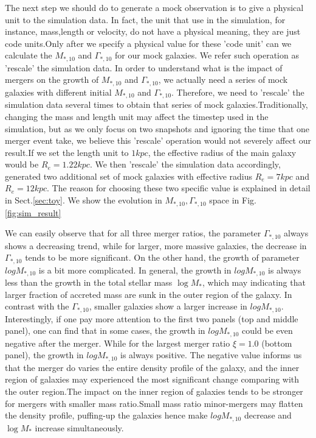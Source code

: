 \documentclass[fleqn,usenatbib]{mnras}
\begin{document}
\par The next step we should do to generate a mock observation is to give a physical unit to the simulation data. In fact, the unit that \cite{nipoti2009} use in the simulation, for instance, mass,length or velocity, do not have a physical meaning, they are just code units.Only after we specify a physical value for these 'code unit' can we calculate the $M_{*,10}$ and $\Gamma_{*,10}$ for our mock galaxies. We refer such operation as 'rescale' the simulation data. In order to understand what is the impact of mergers on the growth of $M_{*,10}$ and $\Gamma_{*,10}$, we actually need a series of mock galaxies with different initial $M_{*,10}$ and $\Gamma_{*,10}$. Therefore, we need to 'rescale' the simulation data several times to obtain that series of mock galaxies.Traditionally, changing the mass and length unit may affect the timestep used in the simulation, but as we only focus on two snapshots and ignoring the time that one merger event take, we believe this 'rescale' operation would not severely affect our result.If we set the length unit to $1 kpc$, the effective radius of the main galaxy would be $R_e = 1.22 kpc$. We then 'rescale' the simulation data accordingly, generated two additional set of mock galaxies with effective radius $R_e = 7kpc$ and $R_e = 12kpc$.  The reason for choosing these two specific value is explained in detail in Sect.\ref{sec:toy}. We show the evolution in $M_{*,10},\Gamma_{*,10}$ space in Fig.\ref{fig:sim_result}
\par We can easily observe that for all three merger ratios, the parameter $\Gamma_{*,10}$ always shows a decreasing trend, while for larger, more massive galaxies, the decrease in $\Gamma_{*,10}$ tends to be more significant. On the other hand, the growth of parameter $log M_{*,10}$ is a bit more complicated. In general, the growth in $log M_{*,10}$ is always less than the growth in the total stellar mass $\log M_*$, which may indicating that larger fraction of accreted mass are sunk in the outer region of the galaxy. In contrast with the $\Gamma_{*,10}$, smaller galaxies show a larger increase in $log M_{*,10}$. Interestingly, if one pay more attention to the first two panels (top and middle panel), one can find that in some cases, the growth in $log M_{*,10}$ could be even negative after the merger. While for the largest merger ratio $\xi = 1.0$ (bottom panel), the growth in $log M_{*,10}$ is always positive. The negative value informs us that the merger do varies the entire density profile of the galaxy, and the inner region of galaxies may experienced the most significant change comparing with the outer region.The impact on the inner region of galaxies tends to be stronger for mergers with smaller mass ratio.Small mass ratio minor-mergers may flatten the density profile, puffing-up the galaxies hence make $log M_{*,10}$ decrease and $\log M_*$ increase simultaneously.
\end{document}
